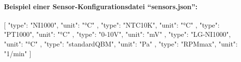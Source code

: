 \ifoot{\leftmark}
\appendix
{}
\paragraph{Beispiel einer Sensor-Konfigurationsdatei \enquote{sensors.json}:}
\begin{jsoncode}
{
	[
		{
			"type": "NI1000",
			"unit": "°C"
		},
		{
			"type": "NTC10K",
			"unit": "°C"
		},
		{
			"type": "PT1000",
			"unit": "°C"
		},
		{
			"type": "0-10V",
			"unit": "mV"
		},
		{
			"type": "LG-NI1000",
			"unit": "°C"
		},
		{
			"type": "standardQBM",
			"unit": "Pa"
		},
		{
			"type": "RPMmax",
			"unit": "1/min"
		}
	]
}
\end{jsoncode}